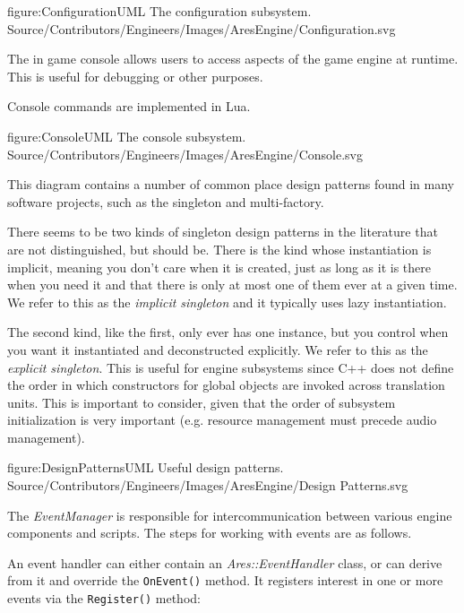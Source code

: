 \FullPageDiagram
    {figure:ConfigurationUML}
    {The configuration subsystem.}
    {Source/Contributors/Engineers/Images/AresEngine/Configuration.svg}

\page
{}
The in game console allows users to access aspects of the game engine at runtime. This is useful for debugging or other purposes.

Console commands are implemented in Lua.

\FullPageDiagram
    {figure:ConsoleUML}
    {The console subsystem.}
    {Source/Contributors/Engineers/Images/AresEngine/Console.svg}

\page
{}
This diagram contains a number of common place design patterns found in many software projects, such as the singleton and multi-factory. 

There seems to be two kinds of singleton design patterns in the literature that are not distinguished, but should be. There is the kind whose instantiation is implicit, meaning you don't care when it is created, just as long as it is there when you need it and that there is only at most one of them ever at a given time. We refer to this as the {\it implicit singleton} and it typically uses lazy instantiation.

The second kind, like the first, only ever has one instance, but you control when you want it instantiated and deconstructed explicitly. We refer to this as the {\it explicit singleton}. This is useful for engine subsystems since C++ does not define the order in which constructors for global objects are invoked across translation units. This is important to consider, given that the order of subsystem initialization is very important (e.g. resource management must precede audio management).

\FullPageDiagram
    {figure:DesignPatternsUML}
    {Useful design patterns.}
    {Source/Contributors/Engineers/Images/AresEngine/Design Patterns.svg}

\page 
{}
The {\it EventManager} is responsible for intercommunication between various engine components and scripts. The steps for working with events are as follows.

An event handler can either contain an {\it Ares::EventHandler} class, or can derive from it and override the {\tt OnEvent()} method. It registers interest in one or more events via the {\tt Register()} method:

